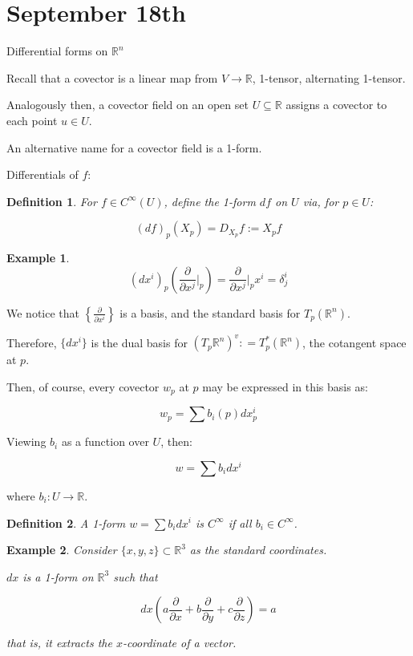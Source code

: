 \documentclass[10pt]{article}
\newtheorem{definition}{Definition}[section]
\newtheorem{example}{Example}[section]
\begin{document}
\section{September 18th}

Differential forms on $\mathbb{R}^n$

Recall that a covector is a linear map from $V \to \mathbb{R}$, 1-tensor, alternating 1-tensor.

Analogously then, a covector field on an open set $U \subseteq \mathbb{R}$ assigns a covector to each point $u \in U$.

An alternative name for a covector field is a 1-form. 

Differentials of $f$:

\begin{definition}
For $f \in C^\infty(U)$, define the 1-form $df$ on $U$ via, for $p \in U$:

$$(df)_p (X_p) = D_{X_p} f := X_p f $$

\end{definition}

\begin{example}
$$(dx^i)_p \left(\frac{\partial}{\partial x^j} \bigg|_p\right) = \frac{\partial}{\partial x^j} \bigg|_p x^i = \delta_j^i $$
\end{example}

We notice that $\left\{ \frac{\partial}{\partial x^i} \right\}$ is a basis, and the standard basis for $T_p(\mathbb{R}^n)$.

Therefore, $\{ dx^i \}$ is the dual basis for $(T_p \mathbb{R}^n)^v : = T_p^*(\mathbb{R}^n)$, the cotangent space at $p$. 

Then, of course, every covector $w_p$ at $p$ may be expressed in this basis as:

$$ w_p = \sum b_i(p) dx^i_p $$

Viewing $b_i$ as a function over $U$, then:

$$ w = \sum b_i dx^i $$

where $b_i : U \to \mathbb{R}$.

\begin{definition}
A 1-form $ w = \sum b_i dx^i $ is $C^\infty$ if all $b_i \in C^\infty$.
\end{definition}

\begin{example}

Consider $\{ x, y, z\} \subset \mathbb{R}^3$ as the standard coordinates. 

$dx$ is a 1-form on $\mathbb{R}^3$ such that

$$ dx\left( a\frac{\partial}{\partial x} + b\frac{\partial}{\partial y} + c\frac{\partial}{\partial z} \right) = a$$

that is, it extracts the $x$-coordinate of a vector.
\end{example}
\end{document}
